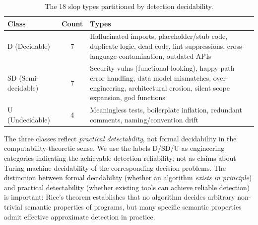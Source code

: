 \documentclass[11pt, a4paper, logo, copyright]{googledeepmind}
\begin{document}
\begin{table}[htbp]
\centering
\caption{The 18 slop types partitioned by detection decidability.}
\label{tab:slop-partition}
\small
\begin{tabularx}{\textwidth}{l c X}
\toprule
\textbf{Class} & \textbf{Count} & \textbf{Types} \\
\midrule
D (Decidable) & 7 & Hallucinated imports, placeholder/stub code, duplicate logic, dead code, lint suppressions, cross-language contamination, outdated APIs \\
\addlinespace
SD (Semi-decidable) & 7 & Security vulns (functional-looking), happy-path error handling, data model mismatches, over-engineering, architectural erosion, silent scope expansion, god functions \\
\addlinespace
U (Undecidable) & 4 & Meaningless tests, boilerplate inflation, redundant comments, naming/convention drift \\
\bottomrule
\end{tabularx}
\end{table}

The three classes reflect \emph{practical detectability}, not formal decidability in the computability-theoretic sense. We use the labels D/SD/U as engineering categories indicating the achievable detection reliability, not as claims about Turing-machine decidability of the corresponding decision problems. The distinction between formal decidability (whether an algorithm \emph{exists in principle}) and practical detectability (whether existing tools can achieve reliable detection) is important: Rice's theorem establishes that no algorithm decides arbitrary non-trivial semantic properties of programs, but many specific semantic properties admit effective approximate detection in practice.
\end{document}

